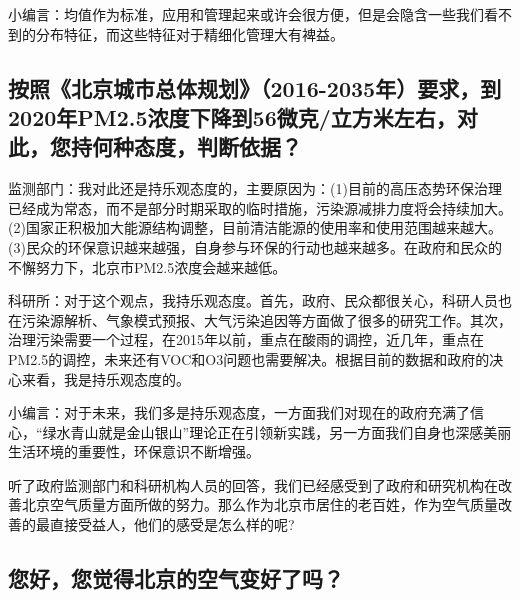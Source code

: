 \documentclass[
]{book}
\begin{document}
小编言：均值作为标准，应用和管理起来或许会很方便，但是会隐含一些我们看不到的分布特征，而这些特征对于精细化管理大有裨益。

\hypertarget{ux6309ux7167ux5317ux4eacux57ceux5e02ux603bux4f53ux89c4ux52122016-2035ux5e74ux8981ux6c42ux52302020ux5e74pm2.5ux6d53ux5ea6ux4e0bux964dux523056ux5faeux514bux7acbux65b9ux7c73ux5de6ux53f3ux5bf9ux6b64ux60a8ux6301ux4f55ux79cdux6001ux5ea6ux5224ux65adux4f9dux636e}{%
\subsection{按照《北京城市总体规划》（2016-2035年）要求，到2020年PM2.5浓度下降到56微克/立方米左右，对此，您持何种态度，判断依据？}\label{ux6309ux7167ux5317ux4eacux57ceux5e02ux603bux4f53ux89c4ux52122016-2035ux5e74ux8981ux6c42ux52302020ux5e74pm2.5ux6d53ux5ea6ux4e0bux964dux523056ux5faeux514bux7acbux65b9ux7c73ux5de6ux53f3ux5bf9ux6b64ux60a8ux6301ux4f55ux79cdux6001ux5ea6ux5224ux65adux4f9dux636e}}

监测部门：我对此还是持乐观态度的，主要原因为：(1)目前的高压态势环保治理已经成为常态，而不是部分时期采取的临时措施，污染源减排力度将会持续加大。(2)国家正积极加大能源结构调整，目前清洁能源的使用率和使用范围越来越大。(3)民众的环保意识越来越强，自身参与环保的行动也越来越多。在政府和民众的不懈努力下，北京市PM2.5浓度会越来越低。

科研所：对于这个观点，我持乐观态度。首先，政府、民众都很关心，科研人员也在污染源解析、气象模式预报、大气污染追因等方面做了很多的研究工作。其次，治理污染需要一个过程，在2015年以前，重点在酸雨的调控，近几年，重点在PM2.5的调控，未来还有VOC和O3问题也需要解决。根据目前的数据和政府的决心来看，我是持乐观态度的。

小编言：对于未来，我们多是持乐观态度，一方面我们对现在的政府充满了信心，``绿水青山就是金山银山''理论正在引领新实践，另一方面我们自身也深感美丽生活环境的重要性，环保意识不断增强。

听了政府监测部门和科研机构人员的回答，我们已经感受到了政府和研究机构在改善北京空气质量方面所做的努力。那么作为北京市居住的老百姓，作为空气质量改善的最直接受益人，他们的感受是怎么样的呢?

\hypertarget{ux60a8ux597dux60a8ux89c9ux5f97ux5317ux4eacux7684ux7a7aux6c14ux53d8ux597dux4e86ux5417}{%
\subsection{您好，您觉得北京的空气变好了吗？}\label{ux60a8ux597dux60a8ux89c9ux5f97ux5317ux4eacux7684ux7a7aux6c14ux53d8ux597dux4e86ux5417}}
\end{document}
